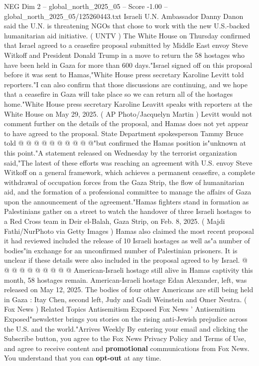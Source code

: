 \begin{textsample}{NEG Dim 2 – global\_north\_2025\_05 – Score -1.00 – global\_north\_2025\_05/125260443.txt}  \label{ex:f2_neg_229}
Israeli U.N.
Ambassador Danny Danon said the U.N. is threatening NGOs that chose to work with the new U.S.-backed humanitarian aid initiative. ( UNTV ) The White House on Thursday confirmed that Israel agreed to a ceasefire proposal submitted by Middle East envoy Steve Witkoff and President Donald Trump in a move to return the 58 hostages who have been held in Gaza for more than 600 days."Israel signed off on this proposal before it was sent to Hamas,"White House press secretary Karoline Levitt told reporters."I can also confirm that those discussions are continuing, and we hope that a ceasefire in Gaza will take place so we can return all of the hostages home."White House press secretary Karoline Leavitt speaks with reporters at the White House on May 29, 2025. ( AP Photo/Jacquelyn Martin ) Levitt would not comment further on the details of the proposal, and Hamas does not yet appear to have agreed to the proposal.
State Department spokesperson Tammy Bruce told @ @ @ @ @ @ @ @ @ @"but confirmed the Hamas position is"unknown at this point."A statement released on Wednesday by the terrorist organization said,"The latest of these efforts was reaching an agreement with U.S. envoy Steve Witkoff on a general framework, which achieves a permanent ceasefire, a complete withdrawal of occupation forces from the Gaza Strip, the flow of humanitarian aid, and the formation of a professional committee to manage the affairs of Gaza upon the announcement of the agreement."Hamas fighters stand in formation as Palestinians gather on a street to watch the handover of three Israeli hostages to a Red Cross team in Deir el-Balah, Gaza Strip, on Feb. 8, 2025. ( Majdi Fathi/NurPhoto via Getty Images ) Hamas also claimed the most recent proposal it had reviewed included the release of 10 Israeli hostages as well as"a number of bodies"in exchange for an unconfirmed number of Palestinian prisoners.
It is unclear if these details were also included in the proposal agreed to by Israel. @ @ @ @ @ @ @ @ @ @ American-Israeli hostage still alive in Hamas captivity this month, 58 hostages remain.
American-Israeli hostage Edan Alexander, left, was released on May 12, 2025.
The bodies of four other Americans are still being held in Gaza : Itay Chen, second left, Judy and Gadi Weinstein and Omer Neutra. ( Fox News ) Related Topics Antisemitism Exposed Fox News ' Antisemitism Exposed"newsletter brings you stories on the rising anti-Jewish prejudice across the U.S. and the world."Arrives Weekly By entering your email and clicking the Subscribe button, you agree to the Fox News Privacy Policy and Terms of Use, and agree to receive content and \textbf{promotional} communications from Fox News.
You understand that you can \textbf{opt-out} at any time.

\end{textsample}
